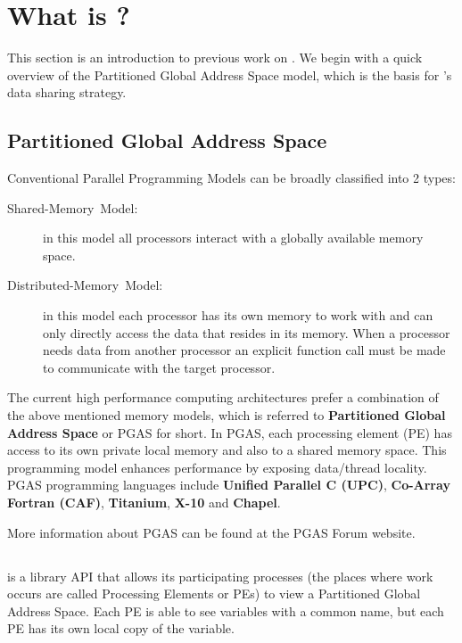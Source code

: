 
\section{What is \openshmem?}

This section is an introduction to previous work on \openshmem. We begin
with a quick overview of the Partitioned Global Address Space model,
which is the basis for \openshmem's data sharing strategy.


\subsection{Partitioned Global Address Space}

Conventional Parallel Programming Models can be broadly classified
into 2 types: 
\begin{description}
\item [{{Shared-Memory~Model:}}] in this model all processors interact
with a globally available memory space. 
\item [{{Distributed-Memory~Model:}}] in this model each processor has
its own memory to work with and can only directly access the data
that resides in its memory. When a processor needs data from another
processor an explicit function call must be made to communicate with
the target processor. 
\end{description}
The current high performance computing architectures prefer a combination
of the above mentioned memory models, which is referred to \textbf{Partitioned
Global Address Space} or PGAS for short. In PGAS, each processing
element (PE) has access to its own private local memory and also to
a shared memory space. This programming model enhances performance
by exposing data/thread locality. PGAS programming languages include
\textbf{Unified Parallel C (UPC)}, \textbf{Co-Array Fortran (CAF)},
\textbf{Titanium}, \textbf{X-10} and \textbf{Chapel}.

More information about PGAS can be found at the PGAS Forum website.\cite{pgasfor}


\subsection{\openshmem}

%

\openshmem is a library API that allows its participating processes (the
places where work occurs are called Processing Elements or PEs) to
view a Partitioned Global Address Space. Each PE is able to see
variables with a common name, but each PE has its own local copy
of the variable.

